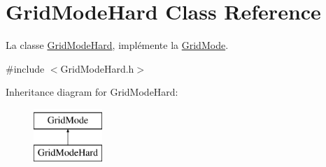 \hypertarget{classGridModeHard}{\section{Grid\-Mode\-Hard Class Reference}
\label{classGridModeHard}
}


La classe \hyperlink{classGridModeHard}{Grid\-Mode\-Hard}, implémente la \hyperlink{classGridMode}{Grid\-Mode}.  




{\ttfamily \#include $<$Grid\-Mode\-Hard.\-h$>$}

Inheritance diagram for Grid\-Mode\-Hard\-:\begin{figure}[H]
\begin{center}
\leavevmode
\includegraphics[height=2.000000cm]{classGridModeHard}
\end{center}
\end{figure}
